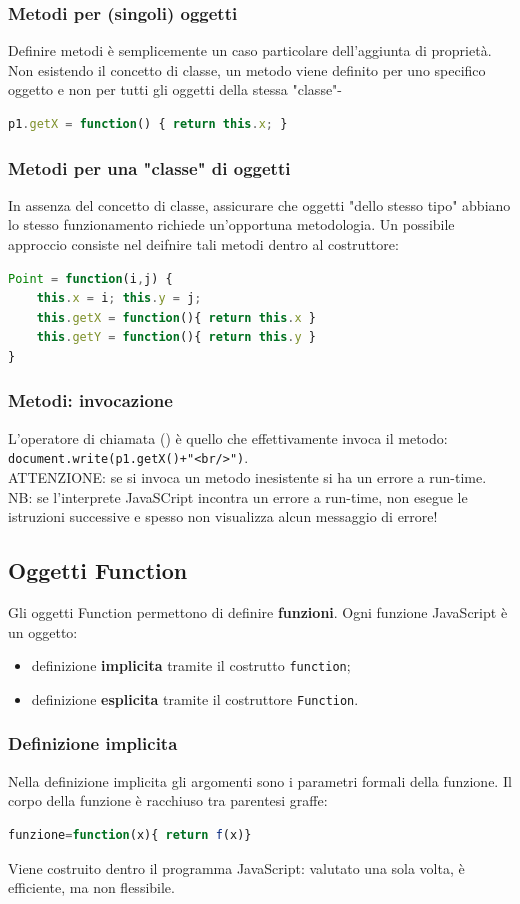 \documentclass{article}
\begin{document}
\subsubsection{Metodi per (singoli) oggetti}
Definire metodi è semplicemente un caso particolare dell'aggiunta di proprietà. Non esistendo il concetto di classe, un metodo viene definito per uno specifico oggetto e non per tutti gli oggetti della stessa "classe"-
\begin{lstlisting}[language=JavaScript]
p1.getX = function() { return this.x; }
\end{lstlisting}
\subsubsection{Metodi per una "classe" di oggetti}
In assenza del concetto di classe, assicurare che oggetti "dello stesso tipo" abbiano lo stesso funzionamento richiede un'opportuna metodologia. Un possibile approccio consiste nel deifnire tali metodi dentro al costruttore:
\begin{lstlisting}[language=JavaScript]
Point = function(i,j) {
    this.x = i; this.y = j;
    this.getX = function(){ return this.x }
    this.getY = function(){ return this.y }
}
\end{lstlisting}

\subsubsection{Metodi: invocazione}
L'operatore di chiamata () è quello che effettivamente invoca il metodo: \texttt{document.write(p1.getX()+"<br/>")}.
\\ ATTENZIONE: se si invoca un metodo inesistente si ha un errore a run-time. NB: se l'interprete JavaSCript incontra un errore a run-time, non esegue le istruzioni successive e spesso non visualizza alcun messaggio di errore!
\subsection{Oggetti Function}
Gli oggetti Function permettono di definire \textbf{funzioni}. Ogni funzione JavaScript è un oggetto:
\begin{itemize}
    \item definizione \textbf{implicita} tramite il costrutto \texttt{function};
    \item definizione \textbf{esplicita} tramite il costruttore \texttt{Function}.
\end{itemize}
\subsubsection{Definizione implicita}
Nella definizione implicita gli argomenti sono i parametri formali della funzione. Il corpo della funzione è racchiuso tra parentesi graffe:
\begin{lstlisting}[language=JavaScript]
funzione=function(x){ return f(x)}
\end{lstlisting}
Viene costruito dentro il programma JavaScript: valutato una sola volta, è efficiente, ma non flessibile.
\end{document}
